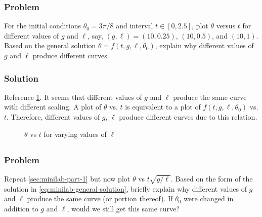 \documentclass[12pt,twoside]{article}
\begin{document}
  \subsubsection*{Problem}
  For the initial conditions $\theta_0=3\pi/8$ and interval $t\in[0,2.5]$, plot
  $\theta$ versus $t$ for different values of $g$ and $\ell$, say,
  $(g,\ell)=(10, 0.25)$, $(10, 0.5)$, and $(10, 1)$. Based on the general
  solution $\theta = f(t,g,\ell,\theta_0)$, explain why different values of $g$
  and $\ell$ produce different curves.

  \subsubsection*{Solution}
  Reference \cref{fig:minilab-part-1-solution}. It seems that different values of $g$ and
  $\ell$ produce the same curve with different scaling. A plot of $\theta$ vs.
  $t$ is equivalent to a plot of $f(t,g,\ell,\theta_0)$ vs. $t$. Therefore,
  different values of $g$, $\ell$ produce different curves due to this relation.
  \begin{figure}
    \centering
    \caption{$\theta$ vs $t$ for varying values of $\ell$}
\label{fig:minilab-part-1-solution}
  \end{figure}

\subsection{}
\label{sec:minilab-part-2}
  \subsubsection*{Problem}
  Repeat \cref{sec:minilab-part-1} but now plot $\theta$ vs $t\sqrt{g/\ell}$.
  Based on the form of the solution in \cref{eq:minilab-general-solution},
  briefly explain why different values of $g$ and $\ell$ produce the same curve
  (or portion thereof). If $\theta_0$ were changed in addition to $g$ and
  $\ell$, would we still get this same curve?
\end{document}
